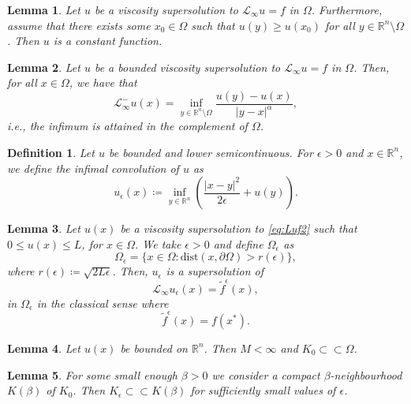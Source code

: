 \documentclass[10pt,a4paper]{amsart}
\newtheorem{lem}{Lemma}
\newtheorem{definition}{Definition}
\providecommand{\Linf}{\mathcal{L}_{\infty}}
\providecommand{\Lneg}{\mathcal{L}_{\infty}^-}
\providecommand{\Rn}{\mathbb{R}^n}
\newcommand{\dist}{\mathrm{dist}}
\providecommand{\ue}{u_{\epsilon}}
\begin{document}
\begin{lem}
\label{lem:strongmaxprinc}
   Let $u$ be a viscosity supersolution to $\Linf u = f$ in $\Omega$. Furthermore, assume that there exists some $x_0 \in \Omega$ such that $u(y) \geq u(x_0)$ for all $y \in \Rn \setminus \Omega$. Then $u$ is a constant function.
\end{lem}

\begin{lem}
\label{lem:Linfcont}
Let $u$ be a bounded viscosity supersolution to $\Linf u = f$ in $\Omega$. Then, for all $x \in \Omega$, we have that
\begin{equation}
\label{eq:Linf}
    \Lneg u(x) = \inf_{y \in \Rn \setminus \Omega} \frac{u(y)-u(x)}{|y-x|^{\alpha}},
\end{equation}
i.e., the infimum is attained in the complement of $\Omega$.
\end{lem}

\begin{definition}
\label{def:infconv}
    Let $u$ be bounded and lower semicontinuous. For $\epsilon > 0$ and $x \in \Rn$, we define the infimal convolution of $u$ as 
\begin{equation}\label{eq:infconv}
      u_{\epsilon}(x) \coloneqq \inf_{y \in \Rn} \left(\frac{|x-y|^2}{2 \epsilon} + u(y)\right) .    
\end{equation}
\end{definition}

\begin{lem}
\label{lem:infconv}
Let $u(x)$ be a viscosity supersolution to \eqref{eq:Luf2} such that $0 \leq u(x) \leq L$, for $x \in \Omega$. We take $\epsilon >0$ and define $\Omega_{\epsilon}$ as 
$$
\Omega_{\epsilon} = \{x \in \Omega: \dist(x, \partial \Omega)> r(\epsilon)\},
$$
where $r(\epsilon) \coloneqq \sqrt{2L\epsilon}$. Then, $u_{\epsilon}$ is a supersolution of
    \begin{equation*}
        \Linf \ue (x) = \tilde{f}^{\epsilon}(x),
    \end{equation*}
in $\Omega_{\epsilon}$ in the classical sense where
$$
\tilde{f}^{\epsilon}(x) =  f(x^*).
$$
\end{lem}

\begin{lem}
\label{lem:A1}
    Let $u(x)$ be bounded on $ \Rn$.
Then $M < \infty$ and $K_0 \subset \subset \Omega$.
\end{lem}

\begin{lem}\label{lem:A2}
      For some small enough $\beta>0$ we consider a compact $\beta$-neighbourhood $K(\beta)$ of $K_0$. Then $K_{\epsilon} \subset \subset K(\beta)$ for sufficiently small values of $\epsilon$.
\end{lem}
\end{document}
